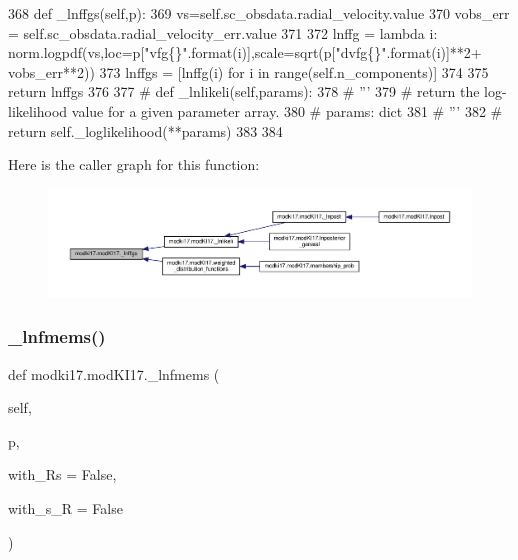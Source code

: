 \begin{DoxyCode}
368     \textcolor{keyword}{def }\_lnffgs(self,p):
369         vs=self.sc\_obsdata.radial\_velocity.value
370         vobs\_err = self.sc\_obsdata.radial\_velocity\_err.value
371         
372         lnffg = \textcolor{keyword}{lambda} i: norm.logpdf(vs,loc=p[\textcolor{stringliteral}{"vfg\{\}"}.format(i)],scale=sqrt(p[\textcolor{stringliteral}{"dvfg\{\}"}.format(i)]**2+
      vobs\_err**2))
373         lnffgs = [lnffg(i) \textcolor{keywordflow}{for} i \textcolor{keywordflow}{in} range(self.n\_components)]
374         
375         \textcolor{keywordflow}{return} lnffgs
376     
377 \textcolor{comment}{#    def \_lnlikeli(self,params):}
378 \textcolor{comment}{#        '''}
379 \textcolor{comment}{#        return the log-likelihood value for a given parameter array.}
380 \textcolor{comment}{#        params: dict}
381 \textcolor{comment}{#        '''}
382 \textcolor{comment}{#        return self.\_loglikelihood(**params)}
383     
384     
\end{DoxyCode}
Here is the caller graph for this function\+:\nopagebreak
\begin{figure}[H]
\begin{center}
\leavevmode
\includegraphics[width=350pt]{df/da3/classmodki17_1_1modKI17_ac4f7ff6b06910b39762b7e4cdddd9063_icgraph}
\end{center}
\end{figure}
\mbox{\label{classmodki17_1_1modKI17_af86144a3ec43facf835be07b718d9560}} 
\subsubsection{\texorpdfstring{\+\_\+lnfmems()}{\_lnfmems()}}
{\footnotesize\ttfamily def modki17.\+mod\+K\+I17.\+\_\+lnfmems (\begin{DoxyParamCaption}\item[{}]{self,  }\item[{}]{p,  }\item[{}]{with\+\_\+\+Rs = {\ttfamily False},  }\item[{}]{with\+\_\+s\+\_\+R = {\ttfamily False} }\end{DoxyParamCaption})\hspace{0.3cm}{\ttfamily [private]}}

